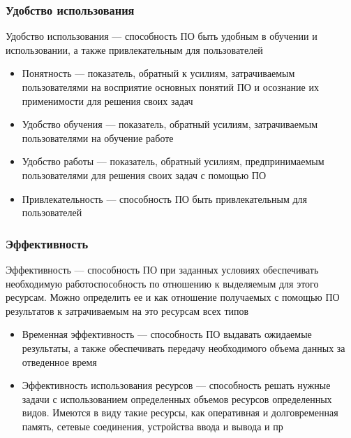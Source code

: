 \documentclass{../industrial-development}
\begin{document}
\begin{frame} \frametitle {Удобство использования}
	\begin{block}{}
		\alert{Удобство использования} --- способность ПО быть удобным в обучении и использовании, а также привлекательным для пользователей 
	\end{block}
	\begin{itemize}
		\item Понятность --- показатель, обратный к усилиям, затрачиваемым пользователями на восприятие основных понятий ПО и осознание их применимости для решения своих задач
	\end{itemize}
	\begin{itemize}
		\item Удобство обучения --- показатель, обратный усилиям, затрачиваемым пользователями на обучение работе
	\end{itemize}
	\begin{itemize}
		\item Удобство работы --- показатель, обратный усилиям, предпринимаемым пользователями для решения своих задач с помощью ПО
	\end{itemize}
	\begin{itemize}
		\item Привлекательность --- способность ПО быть привлекательным для пользователей
	\end{itemize}
\end{frame}

\begin{frame} \frametitle {Эффективность}
	\begin{block}{}
		\alert{Эффективность} --- способность ПО при заданных условиях обеспечивать необходимую работоспособность по отношению к выделяемым для этого ресурсам. Можно определить ее и как отношение получаемых с помощью ПО результатов к затрачиваемым на это ресурсам всех типов 
	\end{block}
	\begin{itemize}
		\item Временная эффективность --- способность ПО выдавать ожидаемые результаты, а также обеспечивать передачу необходимого объема данных за отведенное время
	\end{itemize}
	\begin{itemize}
		\item Эффективность использования ресурсов --- способность решать нужные задачи с использованием определенных объемов ресурсов определенных видов. Имеются в виду такие ресурсы, как оперативная и долговременная память, сетевые соединения, устройства ввода и вывода и пр
	\end{itemize}
\end{frame}
\end{document}
